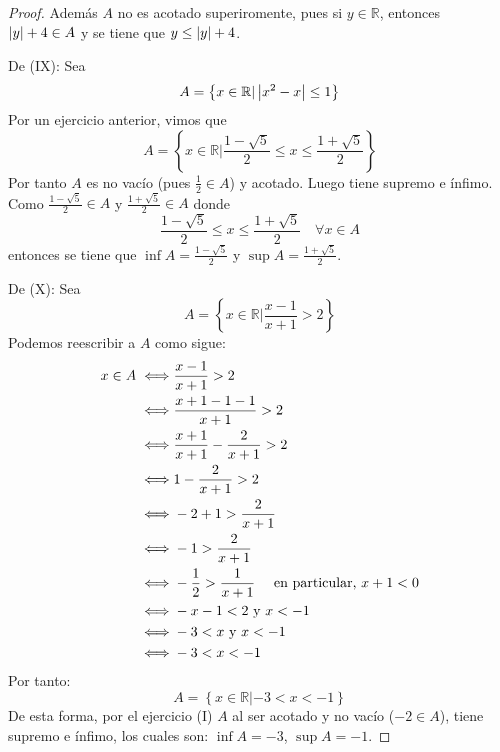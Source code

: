 \documentclass[12pt]{article}
\begin{document}
\begin{enumerate}
\begin{proof}
        Además $A$ no es acotado superiromente, pues si $y\in\mathbb{R}$, entonces $\left| y \right|+4\in A$ y se tiene que $y\leq \left| y \right|+4$.

        De (IX): Sea
        \begin{equation*}
            A = \left\{x\in\mathbb{R}|\left| x^2-x \right|\leq1\right\}
        \end{equation*}
        Por un ejercicio anterior, vimos que
        \begin{equation*}
            A = \left\{x\in\mathbb{R}\Big| \frac{1-\sqrt{5}}{2}\leq x\leq\frac{1+\sqrt{5}}{2}\right\}
        \end{equation*}
        Por tanto $A$ es no vacío (pues $\frac{1}{2}\in A$) y acotado. Luego tiene supremo e ínfimo. Como $\frac{1-\sqrt{5}}{2}\in A$ y $\frac{1+\sqrt{5}}{2}\in A$ donde
        \begin{equation*}
            \frac{1-\sqrt{5}}{2}\leq x\leq\frac{1+\sqrt{5}}{2}\quad\forall x \in A
        \end{equation*}
        entonces se tiene que $\inf A = \frac{1-\sqrt{5}}{2}$ y $\sup A = \frac{1+\sqrt{5}}{2}$.

        De (X): Sea
        \begin{equation*}
            A = \left\{x\in\mathbb{R}|\frac{x-1}{x+1}>2\right\}
        \end{equation*}
        Podemos reescribir a $A$ como sigue:
        \begin{equation*}
            \begin{split}
                x\in A \iff& \frac{x-1}{x+1}>2\\
                \iff& \frac{x+1-1-1}{x+1}>2\\
                \iff& \frac{x+1}{x+1}-\frac{2}{x+1}>2\\
                \iff& 1-\frac{2}{x+1}>2\\
                \iff& -2+1>\frac{2}{x+1}\\
                \iff& -1>\frac{2}{x+1}\\
                \iff& -\frac{1}{2}>\frac{1}{x+1}\quad \textup{ en particular, }x+1<0\\
                \iff& -x-1<2\textup{ y }x<-1\\
                \iff& -3<x\textup{ y }x<-1\\
                \iff& -3<x<-1\\
            \end{split}
        \end{equation*}
        Por tanto:
        \begin{equation*}
            A = \left\{x\in\mathbb{R}|-3<x<-1\right\}
        \end{equation*}
        De esta forma, por el ejercicio (I) $A$ al ser acotado y no vacío ($-2\in A$), tiene supremo e ínfimo, los cuales son: $\inf A = -3$, $\sup A = -1$.


\end{proof}
\end{enumerate}
\end{document}
